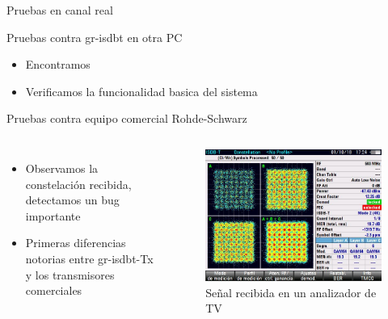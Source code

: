 
\begin{frame}{Pruebas en canal real}
\begin{block}{Pruebas contra gr-isdbt en otra PC}
	\begin{itemize}	
		\item { Encontramos  }
		\item { Verificamos la funcionalidad basica del sistema }
	\end{itemize}
\end{block}

\begin{block}{Pruebas contra equipo comercial Rohde-Schwarz}
\begin{columns}
	\begin{itemize}	
		\item {	Observamos la constelación recibida, detectamos un bug importante }
		\item { Primeras diferencias notorias entre gr-isdbt-Tx y los transmisores comerciales }
	\end{itemize}
	\begin{figure}
		\includegraphics[scale=0.25]{constelacion_eth}
		\caption{Señal recibida en un analizador de TV}
	\end{figure}
\end{columns}
\end{block}
\end{frame}

